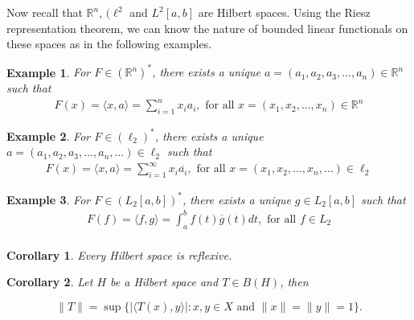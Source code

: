 \documentclass{report}
\newtheorem{exm}{Example}
\newtheorem{cor}{Corollary}
\begin{document}
Now recall that $\mathbb{R}^n$, $(\ell^{2}$ and $L^{2}[a,b]$ are Hilbert spaces. Using the Riesz representation theorem, we can know the nature of bounded linear functionals on these spaces as in the following examples.

\begin{exm}
    For $F \in (\mathbb{R}^n)^{*}$, there exists a unique $a = (a_1, a_2, a_3, \dots, a_n) \in \mathbb{R}^n$ such that
    \begin{align*}
        F(x) = \langle x, a \rangle = \sum_{i=1}^{n} x_i a_i ,  \text{ for all } x = (x_1, x_2, \dots, x_n) \in \mathbb{R}^n
    \end{align*}
\end{exm}

\begin{exm}
   For $F \in (\ell_2)^{*}$, there exists a unique $a = (a_1, a_2, a_3, \dots, a_n, \dots) \in \ell_2$ such that
    \begin{align*}
        F(x) = \langle x, a \rangle = \sum_{i=1}^{\infty} x_i \overline{a_i}, \text{ for all } x = (x_1, x_2, \dots, x_n, \dots) \in \ell_2 
    \end{align*} 
\end{exm}

\begin{exm}
    For $F \in (L_2[a,b])^{*}$, there exists a unique $g \in L_2[a,b]$ such that
    \begin{align*}
        F(f) = \langle f, g \rangle = \int_{a}^{b} f(t) \overline{g}(t) dt, \text{ for all } f \in L_2 \\
    \end{align*}
\end{exm}


\begin{cor}
    Every Hilbert space is reflexive.
\end{cor}

\begin{cor} %
    Let $H$ be a Hilbert space and $T \in B(H)$, then

    $$
    \|T\|  = \sup \{ | \langle T(x), y \rangle | : x, y \in X \text{ and } \|x\| = \|y\| = 1 \}.
    $$
\end{cor}
\end{document}
